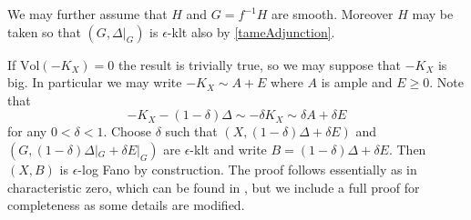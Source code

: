 \documentclass[a4paper,12pt]{book}
\newcommand{\Vol}{\text{Vol}}
\begin{document}
We may further assume that $H$ and $G=f^{-1}H$ are smooth. Moreover $H$ may be taken so that $(G,\Delta|_{G})$ is $\epsilon$-klt also by \autoref{tameAdjunction}.

If $\Vol(-K_{X})=0$ the result is trivially true, so we may suppose that $-K_{X}$ is big. In particular we may write $-K_{X}\sim A+E$ where $A$ is ample and $E \geq 0$. Note that $$-K_{X}-(1-\delta)\Delta\sim -\delta K_{X} \sim \delta A + \delta E$$ for any $0 < \delta <1$. Choose $\delta$ such that $(X,(1-\delta)\Delta+\delta E)$ and $(G,(1-\delta)\Delta|_{G}+\delta E|_{G})$ are $\epsilon$-klt and write $B=(1-\delta)\Delta+\delta E$. Then $(X,B)$ is $\epsilon$-log Fano by construction. The proof follows essentially as in characteristic zero, which can be found in \cite{jiang2014boundedness}, but we include a full proof for completeness as some details are modified.
\end{document}
